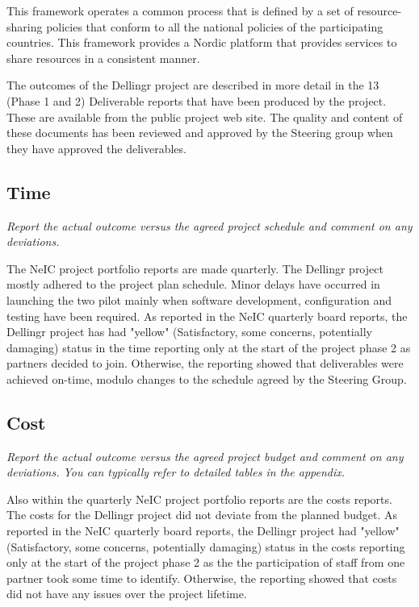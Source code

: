 \documentclass{article}
\newcommand{\dell}{Dellingr\xspace}
\begin{document}
This framework operates a common process that is defined by a set of resource-sharing policies
that conform to all the national policies of the participating countries.
This framework provides a Nordic platform that provides services to share resources
in a consistent manner.

The outcomes of the \dell project are described in more detail in the 13 (Phase 1 and 2) Deliverable reports
that have been produced by the project.
These are available from the public project web site.
The quality and content of these documents has been reviewed and approved by the Steering group when they have approved the deliverables.

\subsection{Time}
{\it Report the actual outcome versus the agreed project schedule and comment on any deviations.}

The NeIC project portfolio reports are made quarterly.
The \dell project mostly adhered to the project plan schedule.
Minor delays have occurred in launching the two pilot mainly when software development, configuration and testing  have been required.
As reported in the NeIC quarterly board reports, the \dell project has had "yellow" (Satisfactory, some concerns, potentially damaging)
status in the time reporting only at the start of the project phase 2 as partners decided to join.
Otherwise, the reporting showed that deliverables were achieved on-time, modulo changes to the schedule agreed by the Steering Group.

\subsection{Cost}
{\it Report the actual outcome versus the agreed project budget and comment on any deviations. You can typically refer to detailed tables in the appendix.}

Also within the quarterly NeIC project portfolio reports are the costs reports.
The costs for the \dell project did not deviate from the planned budget.
As reported in the NeIC quarterly board reports, the \dell project had "yellow" (Satisfactory, some concerns, potentially damaging)
status in the costs reporting only at the start of the project phase 2 as the the participation of staff from one partner
took some time to identify.
Otherwise, the reporting showed that costs did not have any issues over the project lifetime.
\end{document}
